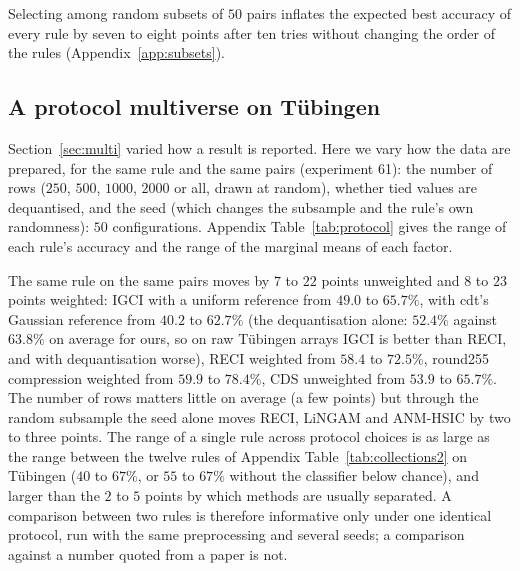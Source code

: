 Selecting among random subsets of $50$ pairs inflates the expected best accuracy of every rule by seven to eight points after ten tries without changing the order of the rules (Appendix~\ref{app:subsets}).

\subsection{A protocol multiverse on T\"ubingen}\label{sec:protocol_multiverse}

Section~\ref{sec:multi} varied how a result is reported. Here we vary how the data are prepared, for the same rule and the same pairs (experiment 61): the number of rows ($250$, $500$, $1000$, $2000$ or all, drawn at random), whether tied values are dequantised, and the seed (which changes the subsample and the rule's own randomness): $50$ configurations. Appendix Table~\ref{tab:protocol} gives the range of each rule's accuracy and the range of the marginal means of each factor.



The same rule on the same pairs moves by $7$ to $22$ points unweighted and $8$ to $23$ points weighted: IGCI with a uniform reference from $49.0$ to $65.7\%$, with cdt's Gaussian reference from $40.2$ to $62.7\%$ (the dequantisation alone: $52.4\%$ against $63.8\%$ on average for ours, so on raw T\"ubingen arrays IGCI is better than RECI, and with dequantisation worse), RECI weighted from $58.4$ to $72.5\%$, round255 compression weighted from $59.9$ to $78.4\%$, CDS unweighted from $53.9$ to $65.7\%$. The number of rows matters little on average (a few points) but through the random subsample the seed alone moves RECI, LiNGAM and ANM-HSIC by two to three points. The range of a single rule across protocol choices is as large as the range between the twelve rules of Appendix Table~\ref{tab:collections2} on T\"ubingen ($40$ to $67\%$, or $55$ to $67\%$ without the classifier below chance), and larger than the $2$ to $5$ points by which methods are usually separated. A comparison between two rules is therefore informative only under one identical protocol, run with the same preprocessing and several seeds; a comparison against a number quoted from a paper is not.
